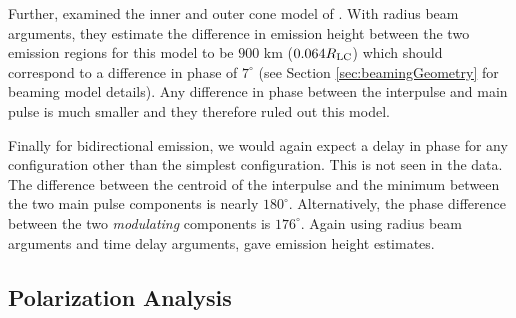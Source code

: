 Further, \cite{weltevrede2007main}
examined the inner and outer cone model of \cite{gil1985interpulse}.
With radius beam arguments, they estimate
the difference in emission height between the two
emission regions for this model to be $900$ km
($0.064R_{\rm{LC}}$) which should correspond to a difference in 
phase of $7^\circ$ (see Section \ref{sec:beamingGeometry}
for beaming model details).  Any difference in phase between the 
interpulse and main pulse is much smaller and they therefore
ruled out this model.

Finally for bidirectional  
emission, we would again expect a delay in phase
for any configuration other than the simplest configuration.
This is not seen in the data.  The difference between
the centroid of the interpulse and the minimum between 
the two main pulse components is nearly $180^\circ$.
Alternatively, the phase difference between the two {\it modulating}
components is $176^{\circ}$.  Again using radius beam arguments
and time delay arguments, \cite{weltevrede2007main} gave 
emission height estimates.


\subsection{Polarization Analysis}

